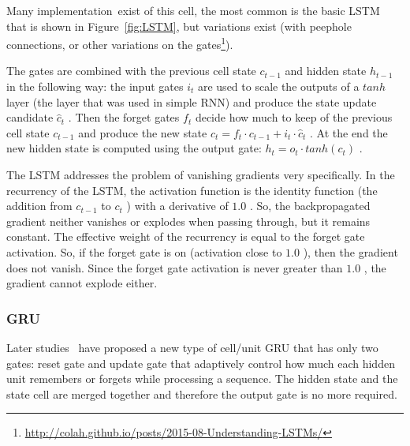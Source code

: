 Many implementation\ exist of this cell, the most common is the basic LSTM that is shown in  Figure~\ref{fig:LSTM}, but variations exist (with peephole connections, or other variations on the gates\footnote{\url{http://colah.github.io/posts/2015-08-Understanding-LSTMs/}}).

The gates are combined with the previous cell state  \( c_{t-1} \)  and hidden state  \( h_{t-1} \)  in the following way: the input gates  \( i_{t} \) are used to scale the outputs of a  \( tanh \)  layer (the layer that was used in simple RNN) and produce the state update candidate  \( \hat c_{t} \) . Then the forget gates  \( f_{t} \)  decide how much to keep of the previous cell state  \( c_{t-1} \)  and produce the new state  \( c_{t}=f_{t}\cdot c_{t-1}+i_{t}\cdot \hat c_{t} \) . At the end the new hidden state is computed using the output gate:  \( h_{t}=o_{t}\cdot tanh \left( c_{t} \right)  \) .

The LSTM addresses the problem of vanishing gradients very specifically. In the recurrency of the LSTM, the activation function is the identity function (the addition from  \( c_{t-1} \)  to  \( c_{t} \) ) with a derivative of  \( 1.0 \) . So, the backpropagated gradient neither vanishes or explodes when passing through, but it remains constant. The effective weight of the recurrency is equal to the forget gate activation. So, if the forget gate is on (activation close to  \( 1.0 \) ), then the gradient does not vanish. Since the forget gate activation is never greater than  \( 1.0 \) , the gradient cannot explode either.

\subsubsection{GRU}
Later studies~\cite{cho2014learning} have proposed a new type of cell/unit GRU that has only two gates: reset gate and update gate that adaptively control how much each hidden unit remembers or forgets while processing a sequence. The hidden state and the state cell are merged together and therefore the output gate is no more required.


